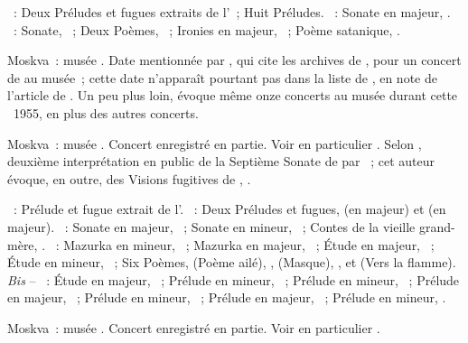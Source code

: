 \begin{description}
 \textsc{\Chostakovitch{}}~: Deux Préludes et fugues extraits de
 l'~; Huit Préludes.
 \textsc{\Prokofiev{}}~: Sonate en \kB \Flat majeur, .
 \textsc{\Scriabine{}}~: Sonate, ~; Deux Poèmes, ~;
 Ironies en \kC majeur,  ~; Poème satanique, .
 \item[\DateWithWeekDay{1955-05-22}]
 Moskva~: musée \Scriabine{}.
 Date mentionnée par \citet[p.~178]{Nekrasova08}, qui cite les archives de
 \citeauthor{Shiryaeva}, pour un concert de \Sofronitsky{} au musée~; cette
 date n'apparaît pourtant pas dans la liste de \citet[p.~449]{Milshteyn82a},
 en note de l'article de \citet{Shiryaeva}.
 Un peu plus loin, \citeauthor{Nekrasova08} évoque même onze concerts au
 musée durant cette ~1955, en plus des autres
 concerts.
 \item[\DateWithWeekDay{1955-06-11}]
 Moskva~: musée \Scriabine{}.
 Concert enregistré en partie.
 Voir en particulier \citet[p.~449]{Milshteyn82a}.
 Selon \citet[p.~391]{Shiryaeva}, deuxième interprétation en public de la
 Septième Sonate de \Prokofiev{} par \Sofronitsky{}~; cet auteur évoque, en
 outre, des Visions fugitives de \Prokofiev{}, .

 \textsc{\Glazounov{}}~: Prélude et fugue extrait de l'.
 \textsc{\Chostakovitch{}}~: Deux Préludes et fugues,  
 (en \kG majeur) et   (en \kE majeur).
 \textsc{\Prokofiev{}}~: Sonate en \kB \Flat majeur, ~; Sonate en
 \kA mineur, ~; Contes de la vieille grand-mère, .
 \textsc{\Scriabine{}}~: Mazurka en \kE mineur,  ~;
 Mazurka en \kB majeur,  ~; Étude en \kF \Sharp majeur,
  ~; Étude en \kC \Sharp mineur,  ~;
 Six Poèmes,   (Poème ailé), , 
  (Masque), ,   et  (Vers la
 flamme).
 \emph{Bis} -- \textsc{\Scriabine{}}~: Étude en \kC \Sharp majeur, 
 ~; Prélude en \kE \Flat mineur,  ~; Prélude en
 \kE \Flat mineur,  ~; Prélude en \kF \Sharp majeur,
  ~; Prélude en \kE \Flat mineur,  ~;
 Prélude en \kC majeur,  ~; Prélude en \kF mineur,
  .
 \item[\DateWithWeekDay{1955-06-25}]
 Moskva~: musée \Scriabine{}.
 Concert enregistré en partie.
 Voir en particulier \citet[p.~449]{Milshteyn82a}.


\end{description}
